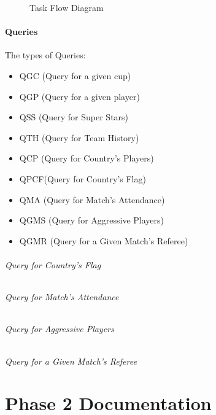 \documentclass{article}
\begin{document}
\begin{figure}[ph]
	\caption{Task Flow Diagram}
	\label{taskflow2}
\end{figure}

\subsection{Queries}
The types of Queries:
\begin{itemize}
	\label{queries}
	\item QGC (Query for a given cup)
	\item QGP (Query for a given player)
	\item QSS (Query for Super Stars)
	\item QTH (Query for Team History)
	\item QCP (Query for Country's Players)
	\item QPCF(Query for Country's Flag)
	\item QMA (Query for Match's Attendance)
	\item QGMS (Query for Aggressive Players)
	\item QGMR (Query for a Given Match's Referee)
\end{itemize}

\paragraph{Query for Country's Flag}
\paragraph{Query for Match's Attendance}
\paragraph{Query for Aggressive Players}
\paragraph{Query for a Given Match's Referee}

\part{Phase 2 Documentation}
\end{document}
